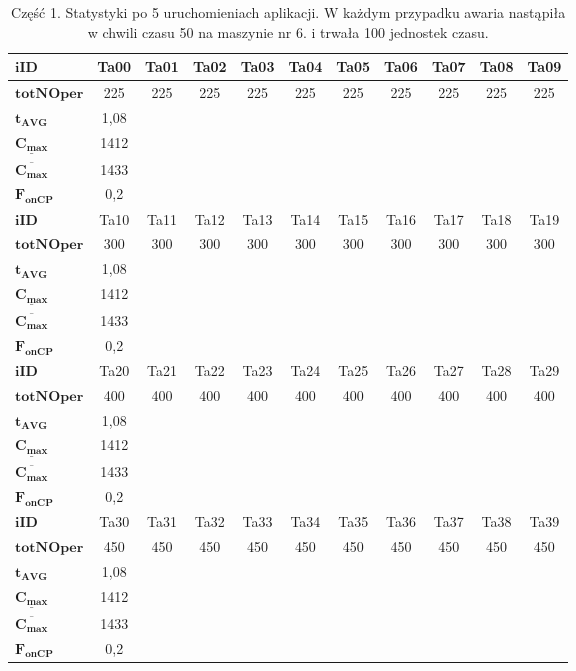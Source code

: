 \documentclass[printmode,oneside]{mgr}
\begin{document}
\begin{table}[ht]
\renewcommand{\arraystretch}{1.2}
\begin{tabularx}{\textwidth}{|X|c|c|c|c|c|c|c|c|c|c|}
\hline
$\mathbf{iID}$ & Ta00 & Ta01 & Ta02 & Ta03 & Ta04 & Ta05 & Ta06 & Ta07 & Ta08 & Ta09\\
\hline
$\mathbf{totNOper}$ & 225 & 225 & 225 & 225 & 225 & 225 & 225 & 225 & 225 & 225\\
\hline
$\mathbf{t_{AVG}}$ & 1,08 &  &  &  &  &  &  &  &  & \\
\hline
$\mathbf{\underline{C_{max}}}$ & 1412 &  &  &  &  &  &  &  &  & \\
\hline
$\mathbf{\overline{C_{max}}}$ & 1433 &  &  &  &  &  &  &  &  & \\
\hline
$\mathbf{F_{onCP}}$ & 0,2 &  &  &  &  &  &  &  &  & \\
\hline
\hline
$\mathbf{iID}$ & Ta10 & Ta11 & Ta12 & Ta13 & Ta14 & Ta15 & Ta16 & Ta17 & Ta18 & Ta19\\
\hline
$\mathbf{totNOper}$ & 300 & 300 & 300 & 300 & 300 & 300 & 300 & 300 & 300 & 300\\
\hline
$\mathbf{t_{AVG}}$ & 1,08 &  &  &  &  &  &  &  &  & \\
\hline
$\mathbf{\underline{C_{max}}}$ & 1412 &  &  &  &  &  &  &  &  & \\
\hline
$\mathbf{\overline{C_{max}}}$ & 1433 &  &  &  &  &  &  &  &  & \\
\hline
$\mathbf{F_{onCP}}$ & 0,2 &  &  &  &  &  &  &  &  & \\
\hline
\hline
$\mathbf{iID}$ & Ta20 & Ta21 & Ta22 & Ta23 & Ta24 & Ta25 & Ta26 & Ta27 & Ta28 & Ta29\\
\hline
$\mathbf{totNOper}$ & 400 & 400 & 400 & 400 & 400 & 400 & 400 & 400 & 400 & 400\\
\hline
$\mathbf{t_{AVG}}$ & 1,08 &  &  &  &  &  &  &  &  & \\
\hline
$\mathbf{\underline{C_{max}}}$ & 1412 &  &  &  &  &  &  &  &  & \\
\hline
$\mathbf{\overline{C_{max}}}$ & 1433 &  &  &  &  &  &  &  &  & \\
\hline
$\mathbf{F_{onCP}}$ & 0,2 &  &  &  &  &  &  &  &  & \\
\hline
\hline
$\mathbf{iID}$ & Ta30 & Ta31 & Ta32 & Ta33 & Ta34 & Ta35 & Ta36 & Ta37 & Ta38 & Ta39\\
\hline
$\mathbf{totNOper}$ & 450 & 450 & 450 & 450 & 450 & 450 & 450 & 450 & 450 & 450\\
\hline
$\mathbf{t_{AVG}}$ & 1,08 &  &  &  &  &  &  &  &  & \\
\hline
$\mathbf{\underline{C_{max}}}$ & 1412 &  &  &  &  &  &  &  &  & \\
\hline
$\mathbf{\overline{C_{max}}}$ & 1433 &  &  &  &  &  &  &  &  & \\
\hline
$\mathbf{F_{onCP}}$ & 0,2 &  &  &  &  &  &  &  &  & \\
\hline
\end{tabularx}
\caption{Część 1. Statystyki po 5 uruchomieniach aplikacji. W każdym przypadku awaria nastąpiła w chwili czasu 50 na maszynie nr 6. i trwała 100 jednostek czasu.}
\label{tab_res_one}
\renewcommand{\arraystretch}{1.0}
\end{table}
\end{document}
